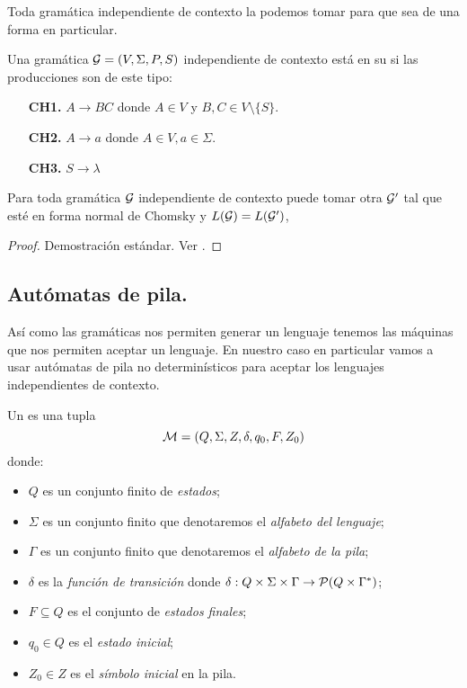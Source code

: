 \documentclass[tesis.tex]{subfiles}
\newcommand{\gramatica}{{\cal G} = (V, \Sigma, P, S)}
\newcommand{\lengderivado}{L({\cal G})}
\begin{document}
Toda gramática independiente de contexto la podemos tomar para que sea de una forma en particular.

\begin{deff}
	Una gramática $\gramatica$ independiente de contexto está en su  si las producciones son de este tipo:
	\begin{enumerate}
		\item[\textbf{CH1.}] $A \to BC$ donde $A\in V$ y $B,C \in V \setminus \{ S \}$.
		\item[\textbf{CH2.}] $A \to a$ donde $A \in V, a \in \Sigma$.
		\item[\textbf{CH3.}] $S \to \lambda$ 
	\end{enumerate}
\end{deff}



\begin{prop}
	Para toda gramática $\cal G$ independiente de contexto puede tomar otra $\cal G'$ tal que esté en forma normal de Chomsky y $\lengderivado = L(\cal G')$,
\end{prop}

\begin{proof}
	Demostración estándar. Ver \cite{hopcraft-ullman}.
\end{proof}

\subsection{Autómatas de pila.}
Así como las gramáticas nos permiten generar un lenguaje tenemos las máquinas que nos permiten aceptar un lenguaje. En nuestro caso en particular vamos a usar autómatas de pila no determinísticos para aceptar los lenguajes independientes de contexto.

\begin{deff}
	Un  es una tupla 
	\[
	{\cal M } = (Q, \Sigma, Z, \delta, q_0, F, Z_0)
	\]
	 donde:
	\begin{itemize}
		\item $Q$ es un conjunto finito de \emph{estados};
		\item $\Sigma$ es un conjunto finito que denotaremos el \emph{alfabeto del lenguaje};
		\item $\Gamma$ es un conjunto finito que denotaremos el \emph{alfabeto de la pila};
		\item $\delta$ es la \emph{función de transición} donde $\delta: Q  \times \Sigma \times \Gamma \to {\cal P}( Q  \times \Gamma^*)$;
		\item $F \subseteq Q$ es el conjunto de \emph{estados finales};
		\item $q_0 \in Q$ es el \emph{estado inicial};
		\item $Z_0 \in Z$ es el \emph{símbolo inicial} en la pila.
	\end{itemize}
\end{deff}
\end{document}
